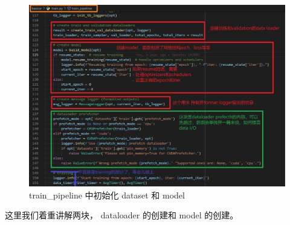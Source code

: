 \documentclass[../main.tex]{subfiles}
\begin{document}
\begin{figure}[h]
    \begin{center}
        \vspace{-0.2cm}
        \includegraphics[width=0.85\linewidth]{figures/getting_start_init_data_model.png}
        \vspace{-0.3cm}
        \caption{train\_pipeline 中初始化 dataset 和 model}
        \label{fig:getting_start_init_data_model}
    \end{center}
    \vspace{-0.5cm}
\end{figure}

这里我们着重讲解两块， dataloader 的创建和 model 的创建。
\end{document}
